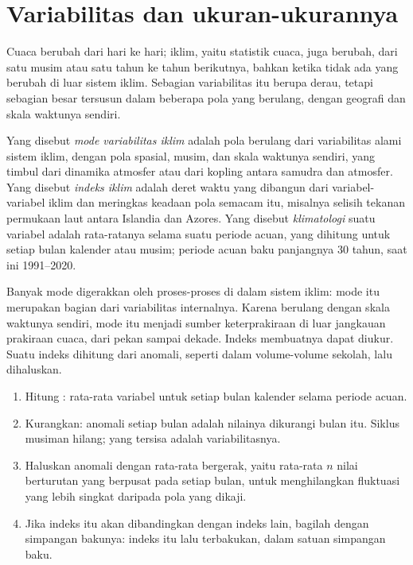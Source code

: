 \section{Variabilitas dan ukuran-ukurannya}\label{sec:b2:climate-variability:measures}

Cuaca berubah dari hari ke hari; iklim, yaitu statistik cuaca, juga berubah, dari satu musim
atau satu tahun ke tahun berikutnya, bahkan ketika tidak ada yang berubah di luar sistem iklim. Sebagian
variabilitas itu berupa derau, tetapi sebagian besar tersusun dalam beberapa pola yang berulang, dengan
geografi dan skala waktunya sendiri.

\begin{definition}\label{def:b2:climate-variability:modes}
Yang disebut \emph{mode variabilitas iklim} adalah pola berulang dari
variabilitas alami sistem iklim, dengan pola spasial, musim, dan skala waktunya
sendiri, yang timbul dari dinamika atmosfer atau dari kopling antara samudra dan
atmosfer. Yang disebut \emph{indeks iklim} adalah deret waktu yang dibangun dari variabel-variabel
iklim dan meringkas keadaan pola semacam itu, misalnya selisih tekanan permukaan laut
antara Islandia dan Azores. Yang disebut \emph{klimatologi} suatu variabel
adalah rata-ratanya selama suatu periode acuan, yang dihitung untuk setiap bulan kalender atau musim; periode
acuan baku panjangnya 30 tahun, saat ini 1991--2020.
\end{definition}

Banyak mode digerakkan oleh proses-proses di dalam sistem iklim: mode itu merupakan bagian dari
variabilitas internalnya. Karena berulang dengan skala waktunya sendiri, mode itu menjadi sumber
keterprakiraan di luar jangkauan prakiraan cuaca, dari pekan sampai dekade. Indeks membuatnya
dapat diukur. Suatu indeks dihitung dari anomali, seperti dalam volume-volume sekolah, lalu
dihaluskan.

\begin{method}\label{met:b2:climate-variability:index}
\begin{enumerate}
  \item Hitung : rata-rata variabel untuk setiap bulan kalender selama periode
        acuan.
  \item Kurangkan: anomali setiap bulan adalah nilainya dikurangi  bulan itu.
        Siklus musiman hilang; yang tersisa adalah variabilitasnya.
  \item Haluskan anomali dengan rata-rata bergerak, yaitu rata-rata $n$ nilai berturutan yang berpusat pada
        setiap bulan, untuk menghilangkan fluktuasi yang lebih singkat daripada pola yang dikaji.
  \item Jika indeks itu akan dibandingkan dengan indeks lain, bagilah dengan simpangan bakunya: indeks
        itu lalu terbakukan, dalam satuan simpangan baku.
\end{enumerate}
\end{method}

